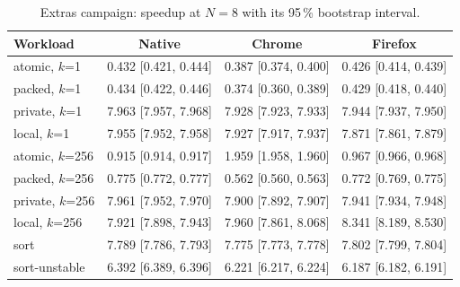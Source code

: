 \begin{table}[htbp]
\caption{Extras campaign: speedup at $N=8$ with its 95\,\% bootstrap interval.}\label{tab:extras-speedup}
\centering\small
\begin{tabular}{lccc}
\toprule
Workload & Native & Chrome & Firefox \\
\midrule
atomic, $k$=1 & 0.432 [0.421, 0.444] & 0.387 [0.374, 0.400] & 0.426 [0.414, 0.439] \\
packed, $k$=1 & 0.434 [0.422, 0.446] & 0.374 [0.360, 0.389] & 0.429 [0.418, 0.440] \\
private, $k$=1 & 7.963 [7.957, 7.968] & 7.928 [7.923, 7.933] & 7.944 [7.937, 7.950] \\
local, $k$=1 & 7.955 [7.952, 7.958] & 7.927 [7.917, 7.937] & 7.871 [7.861, 7.879] \\
\midrule
atomic, $k$=256 & 0.915 [0.914, 0.917] & 1.959 [1.958, 1.960] & 0.967 [0.966, 0.968] \\
packed, $k$=256 & 0.775 [0.772, 0.777] & 0.562 [0.560, 0.563] & 0.772 [0.769, 0.775] \\
private, $k$=256 & 7.961 [7.952, 7.970] & 7.900 [7.892, 7.907] & 7.941 [7.934, 7.948] \\
local, $k$=256 & 7.921 [7.898, 7.943] & 7.960 [7.861, 8.068] & 8.341 [8.189, 8.530] \\
\midrule
sort & 7.789 [7.786, 7.793] & 7.775 [7.773, 7.778] & 7.802 [7.799, 7.804] \\
sort-unstable & 6.392 [6.389, 6.396] & 6.221 [6.217, 6.224] & 6.187 [6.182, 6.191] \\
\bottomrule
\end{tabular}
\end{table}
